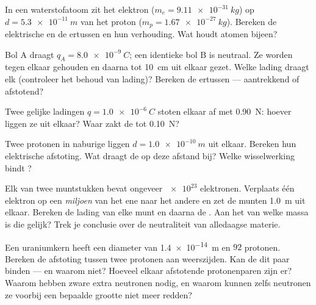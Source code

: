 \begin{exercise}[$\star\star$]\label{exo:g11:fundamental-interactions:7}
In een waterstofatoom zit het elektron ($m_e = \qty{9.11e-31}{kg}$) op
$d = \qty{5.3e-11}{m}$ van het proton ($m_p = \qty{1.67e-27}{kg}$).
Bereken de elektrische en de  ertussen en hun
verhouding. Wat houdt atomen bijeen?
\end{exercise}

\begin{exercise}[$\star\star$]\label{exo:g11:fundamental-interactions:8}
Bol A draagt $q_A = \qty{+8.0e-9}{C}$; een identieke bol B is neutraal.
Ze worden tegen elkaar gehouden en daarna tot \qty{10}{cm} uit elkaar
gezet. Welke lading draagt elk (controleer het behoud van lading)?
Bereken de  ertussen --- aantrekkend of afstotend?
\end{exercise}

\begin{exercise}[$\star\star$]\label{exo:g11:fundamental-interactions:9}
Twee gelijke ladingen $q = \qty{1.0e-6}{C}$ stoten elkaar af met
\qty{0.90}{N}: hoever liggen ze uit elkaar? Waar zakt de  tot
\qty{0.10}{N}?
\end{exercise}

\begin{exercise}[$\star\star$]\label{exo:g11:fundamental-interactions:10}
Twee protonen in naburige  liggen $d = \qty{1.0e-10}{m}$ uit
elkaar. Bereken hun elektrische afstoting. Wat draagt de  op deze afstand bij? Welke wisselwerking bindt ?
\end{exercise}

\begin{exercise}[$\star\star$]\label{exo:g11:fundamental-interactions:11}
Elk van twee muntstukken bevat ongeveer $\num{e23}$ elektronen. Verplaats
één elektron op een \emph{miljoen} van het ene naar het andere en zet de
munten \qty{1.0}{m} uit elkaar. Bereken de lading van elke munt en daarna
de . Aan het  van welke massa is die gelijk? Trek je
conclusie over de neutraliteit van alledaagse materie.
\end{exercise}

\begin{exercise}[$\star\star\star$]\label{exo:g11:fundamental-interactions:12}
Een uraniumkern heeft een diameter van \qty{1.4e-14}{m} en $92$ protonen.
Bereken de afstoting tussen twee protonen aan weerszijden. Kan de  dit paar binden --- en waarom niet? Hoeveel elkaar
afstotende protonenparen zijn er? Waarom hebben zware  extra
neutronen nodig, en waarom kunnen zelfs neutronen ze voorbij een bepaalde
grootte niet meer redden?
\end{exercise}

